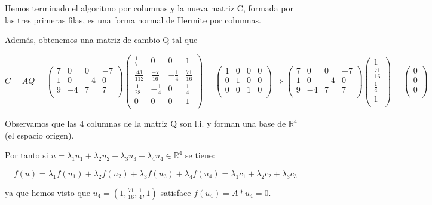 \documentclass[11pt, a4paper]{article}
\newif\IfInSansMode
\newcommand{\R}{\mathbb{R}} \newcommand{\N}{\mathbb{N}}
\theoremstyle{theorem-style}
\theoremstyle{definition-style}
\theoremstyle{remark-style}
\theoremstyle{example-style}
\begin{document}
Hemos terminado el algoritmo por columnas y la nueva matriz C, formada por las tres primeras filas, es una forma normal de Hermite por columnas.

Además, obtenemos una matriz de cambio Q tal que

$$C = AQ = 
\begin{pmatrix}
7 & 0 & 0 & -7\\
1 & 0 & -4 & 0\\
9 & -4 & 7 & 7\\
\end{pmatrix}
\begin{pmatrix}
\frac{1}{7} & 0 & 0 & 1\\
\frac{43}{112} & \frac{-7}{16} & -\frac{1}{4} & \frac{71}{16}\\
\frac{1}{28} & -\frac{1}{4} & 0 & \frac{1}{4}\\
0 & 0 & 0 & 1\\
\end{pmatrix} = 
\begin{pmatrix}
1 & 0 & 0 & 0\\
0 & 1 & 0 & 0\\
0 & 0 & 1 & 0\\
\end{pmatrix} \Longrightarrow 
\begin{pmatrix}
7 & 0 & 0 & -7\\
1 & 0 & -4 & 0\\
9 & -4 & 7 & 7\\
\end{pmatrix}
\begin{pmatrix}
1\\
\frac{71}{16}\\
\frac{1}{4}\\
1\\
\end{pmatrix} =
\begin{pmatrix}
0\\
0\\
0\\
\end{pmatrix}
$$

Observamos que las 4 columnas de la matriz Q son l.i. y forman una base de $\R^4$ (el espacio origen).

Por tanto si $u = \lambda_1u_1+\lambda_2u_2+\lambda_3u_3+\lambda_4u_4 \in \R^4$ se tiene:

$$f(u)=\lambda_1f(u_1)+\lambda_2f(u_2)+\lambda_3f(u_3)+\lambda_4f(u_4) = \lambda_1c_1+\lambda_2c_2+\lambda_3c_3$$

ya que hemos visto que $u_4 = (1,\frac{71}{16},\frac{1}{4},1)$ satisface $f(u_4)= A*u_4=0$.
\end{document}

